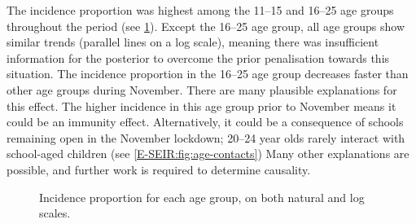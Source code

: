 \documentclass[thesis.tex]{subfiles}
\begin{document}
The incidence proportion was highest among the 11--15 and 16--25 age groups throughout the period (see \cref{transmission:fig:backcalc-ages}).
Except the 16--25 age group, all age groups show similar trends (\ie parallel lines on a log scale), meaning there was insufficient information for the posterior to overcome the prior penalisation towards this situation.
The incidence proportion in the 16--25 age group decreases faster than other age groups during November.
There are many plausible explanations for this effect.
The higher incidence in this age group prior to November means it could be an immunity effect.
Alternatively, it could be a consequence of schools remaining open in the November lockdown; 20--24 year olds rarely interact with school-aged children (see \cref{E-SEIR:fig:age-contacts})
Many other explanations are possible, and further work is required to determine causality.
\begin{figure}
    \caption[Incidence estimated using backcalculation by age group]{%
        Incidence proportion for each age group, on both natural and log scales.
    }
    \label{transmission:fig:backcalc-ages}
\end{figure}
\end{document}
